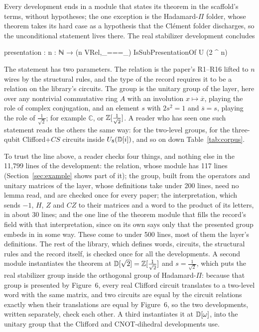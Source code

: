 Every development ends in a module that states its theorem in the
scaffold's terms, without hypotheses; the one exception is the
Hadamard-$\Pi$ folder, whose theorem takes its hard case as a
hypothesis that the Cl\'ement folder discharges, so the unconditional
statement lives there. The real stabilizer development concludes
\begin{agdacode}
presentation : {n : ℕ} → (n VRel,_===_) IsSubPresentationOf U (2 ^ n)
\end{agdacode}
The statement has two parameters. The relation  is
the paper's R1--R16 lifted to $n$ wires by the structural rules, and
the type of the record requires it to be a relation on the library's
circuits. The group  is the unitary
group of the layer, here over any nontrivial commutative ring $A$ with
an involution $x\mapsto\overline{x}$, playing the role of complex
conjugation, and an element $s$ with $2s^2=1$ and $\overline{s}=s$,
playing the role of $\frac1{\sqrt2}$; for example $\mathbb{C}$, or
$\mathbb{Z}[\frac1{\sqrt2}]$. A reader who has seen one such statement reads
the others the same way: 
for the two-level groups,  for the
three-qubit Clifford+$CS$ circuits inside $U_8(\mathbb{D}[i])$, and so on down
Table~\ref{tab:corpus}.

To trust the line above, a reader checks four things, and nothing else
in the 11{,}799 lines of the development: the relation, whose module
has 117 lines (Section~\ref{sec:example} shows part of it); the group,
built from the operators and unitary matrices of the layer, whose
definitions take under 200 lines, need no lemma read, and are checked
once for every paper; the interpretation, which sends $-1$, $H$, $Z$
and $CZ$ to their matrices and a word to the product of its letters,
in about 30 lines; and the one line of the theorem module that fills
the record's field  with that interpretation, since
 on its own says only that the presented
group embeds in  in some way. These come to under 500 lines,
most of them the layer's definitions. The rest of the library, which
defines words, circuits, the structural rules and the record itself,
is checked once for all the developments. A second module instantiates
the theorem at $\mathbb{D}[\sqrt2]=\mathbb{Z}[\frac1{\sqrt2}]$ and $s=\frac1{\sqrt2}$,
which puts the real stabilizer group inside the orthogonal group of
Hadamard-$\Pi$: because that group is presented by Figure~6, every real
Clifford circuit translates to a two-level word with the same matrix,
and two circuits are equal by the circuit relations exactly when their
translations are equal by Figure~6, so the two developments, written
separately, check each other. A third instantiates it at $\mathbb{D}[\omega]$,
into the unitary group that the Clifford and CNOT-dihedral
developments use.

